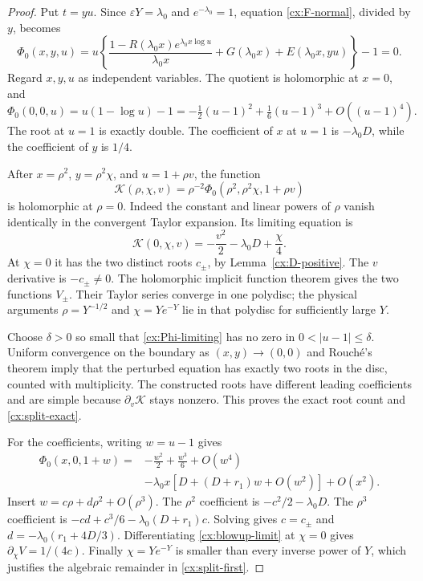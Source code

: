 \documentclass[11pt,a4paper]{article}
\numberwithin{equation}{section}
\theoremstyle{definition}
\theoremstyle{remark}
\begin{document}
\begin{proof}
Put $t=yu$.  Since $\varepsilon Y=\lambda_0$ and
$e^{-\lambda_0}=1$, equation \eqref{cx:F-normal}, divided by $y$,
becomes
\begin{equation}\label{cx:Phi-zero}
 \Phi_0(x,y,u)=
 u\left\{\frac{1-R(\lambda_0x)e^{\lambda_0x\log u}}{\lambda_0x}
                  +G(\lambda_0x)+E(\lambda_0x,yu)\right\}-1=0.
\end{equation}
Regard $x,y,u$ as independent variables.  The quotient is holomorphic at
$x=0$, and
\begin{equation}\label{cx:Phi-limiting}
 \Phi_0(0,0,u)=u(1-\log u)-1
          =-\tfrac12(u-1)^2+\tfrac16(u-1)^3+O((u-1)^4).
\end{equation}
The root at $u=1$ is exactly double.  The coefficient of $x$ at $u=1$ is
$-\lambda_0D$, while the coefficient of $y$ is $1/4$.

After $x=\rho^2$, $y=\rho^2\chi$, and $u=1+\rho v$, the function
\begin{equation}\label{cx:blowup}
 \mathcal K(\rho,\chi,v)
  =\rho^{-2}\Phi_0(\rho^2,\rho^2\chi,1+\rho v)
\end{equation}
is holomorphic at $\rho=0$.  Indeed the constant and linear powers of
$\rho$ vanish identically in the convergent Taylor expansion.  Its
limiting equation is
\begin{equation}\label{cx:blowup-limit}
 \mathcal K(0,\chi,v)=-\frac{v^2}{2}-\lambda_0D+\frac \chi4.
\end{equation}
At $\chi=0$ it has the two distinct roots $c_\pm$, by
Lemma~\ref{cx:D-positive}.  The $v$ derivative is $-c_\pm\ne0$.
The holomorphic implicit function theorem gives the two functions
$V_\pm$.  Their Taylor series converge in one polydisc; the physical
arguments $\rho=Y^{-1/2}$ and $\chi=Ye^{-Y}$ lie in that polydisc for
sufficiently large $Y$.

Choose $\delta>0$ so small that \eqref{cx:Phi-limiting} has no zero in
$0<|u-1|\le\delta$.  Uniform convergence on the boundary as
$(x,y)\to(0,0)$ and Rouch\'e's theorem imply that the perturbed equation
has exactly two roots in the disc, counted with multiplicity.  The
constructed roots have different leading coefficients and are simple
because $\partial_v\mathcal K$ stays nonzero.  This proves the exact
root count and \eqref{cx:split-exact}.

For the coefficients, writing $w=u-1$ gives
\begin{align*}
 \Phi_0(x,0,1+w)
 ={}&-\frac{w^2}{2}+\frac{w^3}{6}+O(w^4)\\
    &-\lambda_0x\left[D+(D+r_1)w+O(w^2)\right]+O(x^2).
\end{align*}
Insert $w=c\rho+d\rho^2+O(\rho^3)$.
The $\rho^2$ coefficient is $-c^2/2-\lambda_0D$.
The $\rho^3$ coefficient is
$-cd+c^3/6-\lambda_0(D+r_1)c$.
Solving gives $c=c_\pm$ and
$d=-\lambda_0(r_1+4D/3)$.  Differentiating
\eqref{cx:blowup-limit} at $\chi=0$ gives $\partial_\chi V=1/(4c)$.
Finally $\chi=Ye^{-Y}$ is smaller than every inverse power of $Y$, which
justifies the algebraic remainder in \eqref{cx:split-first}.
\end{proof}
\end{document}
